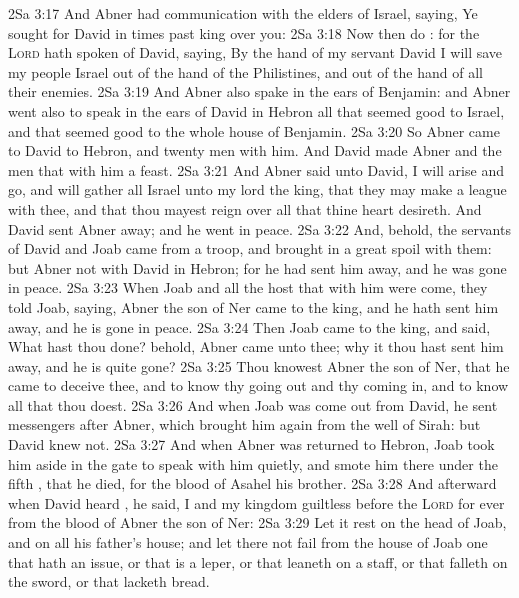 \vs 2Sa 3:17 And Abner had communication with the elders of Israel, saying, Ye sought for David in times past  king over you:
\vs 2Sa 3:18 Now then do : for the \textsc{Lord} hath spoken of David, saying, By the hand of my servant David I will save my people Israel out of the hand of the Philistines, and out of the hand of all their enemies.
\vs 2Sa 3:19 And Abner also spake in the ears of Benjamin: and Abner went also to speak in the ears of David in Hebron all that seemed good to Israel, and that seemed good to the whole house of Benjamin.
\vs 2Sa 3:20 So Abner came to David to Hebron, and twenty men with him. And David made Abner and the men that  with him a feast.
\vs 2Sa 3:21 And Abner said unto David, I will arise and go, and will gather all Israel unto my lord the king, that they may make a league with thee, and that thou mayest reign over all that thine heart desireth. And David sent Abner away; and he went in peace.
\vs 2Sa 3:22 And, behold, the servants of David and Joab came from  a troop, and brought in a great spoil with them: but Abner  not with David in Hebron; for he had sent him away, and he was gone in peace.
\vs 2Sa 3:23 When Joab and all the host that  with him were come, they told Joab, saying, Abner the son of Ner came to the king, and he hath sent him away, and he is gone in peace.
\vs 2Sa 3:24 Then Joab came to the king, and said, What hast thou done? behold, Abner came unto thee; why  it  thou hast sent him away, and he is quite gone?
\vs 2Sa 3:25 Thou knowest Abner the son of Ner, that he came to deceive thee, and to know thy going out and thy coming in, and to know all that thou doest.
\vs 2Sa 3:26 And when Joab was come out from David, he sent messengers after Abner, which brought him again from the well of Sirah: but David knew  not.
\vs 2Sa 3:27 And when Abner was returned to Hebron, Joab took him aside in the gate to speak with him quietly, and smote him there under the fifth , that he died, for the blood of Asahel his brother.
\vs 2Sa 3:28 And afterward when David heard , he said, I and my kingdom  guiltless before the \textsc{Lord} for ever from the blood of Abner the son of Ner:
\vs 2Sa 3:29 Let it rest on the head of Joab, and on all his father's house; and let there not fail from the house of Joab one that hath an issue, or that is a leper, or that leaneth on a staff, or that falleth on the sword, or that lacketh bread.
